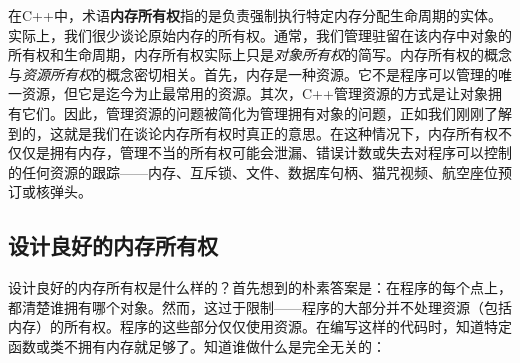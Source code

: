 在C++中，术语\textbf{内存所有权}指的是负责强制执行特定内存分配生命周期的实体。实际上，我们很少谈论原始内存的所有权。通常，我们管理驻留在该内存中对象的所有权和生命周期，内存所有权实际上只是\emph{对象所有权}的简写。内存所有权的概念与\emph{资源所有权}的概念密切相关。首先，内存是一种资源。它不是程序可以管理的唯一资源，但它是迄今为止最常用的资源。其次，C++管理资源的方式是让对象拥有它们。因此，管理资源的问题被简化为管理拥有对象的问题，正如我们刚刚了解到的，这就是我们在谈论内存所有权时真正的意思。在这种情况下，内存所有权不仅仅是拥有内存，管理不当的所有权可能会泄漏、错误计数或失去对程序可以控制的任何资源的跟踪——内存、互斥锁、文件、数据库句柄、猫咒视频、航空座位预订或核弹头。

\subsection{设计良好的内存所有权}

设计良好的内存所有权是什么样的？首先想到的朴素答案是：在程序的每个点上，都清楚谁拥有哪个对象。然而，这过于限制——程序的大部分并不处理资源（包括内存）的所有权。程序的这些部分仅仅使用资源。在编写这样的代码时，知道特定函数或类不拥有内存就足够了。知道谁做什么是完全无关的：

